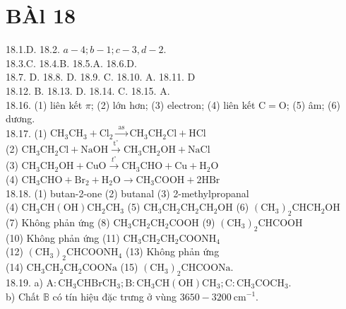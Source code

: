 \documentclass[10pt]{article}
\begin{document}
\section*{BÀl 18}
18.1.D. 18.2. $a-4 ; b-1 ; c-3, d-2$.\\
18.3.C. 18.4.B. 18.5.A. 18.6.D.\\
18.7. D. 18.8. D. 18.9. C. 18.10. A. 18.11. D\\
18.12. B. 18.13. D. 18.14. C. 18.15. A.\\
18.16. (1) liên kết $\pi$; (2) lớn hơn; (3) electron; (4) liên kết $\mathrm{C}=\mathrm{O}$; (5) âm; (6) dương.\\
18.17. (1) $\mathrm{CH}_{3} \mathrm{CH}_{3}+\mathrm{Cl}_{2} \xrightarrow{\text { as }} \mathrm{CH}_{3} \mathrm{CH}_{2} \mathrm{Cl}+\mathrm{HCl}$\\
(2) $\mathrm{CH}_{3} \mathrm{CH}_{2} \mathrm{Cl}+\mathrm{NaOH} \xrightarrow{\mathrm{t}^{\circ}} \mathrm{CH}_{3} \mathrm{CH}_{2} \mathrm{OH}+\mathrm{NaCl}$\\
(3) $\mathrm{CH}_{3} \mathrm{CH}_{2} \mathrm{OH}+\mathrm{CuO} \xrightarrow{t^{\circ}} \mathrm{CH}_{3} \mathrm{CHO}+\mathrm{Cu}+\mathrm{H}_{2} \mathrm{O}$\\
(4) $\mathrm{CH}_{3} \mathrm{CHO}+\mathrm{Br}_{2}+\mathrm{H}_{2} \mathrm{O} \longrightarrow \mathrm{CH}_{3} \mathrm{COOH}+2 \mathrm{HBr}$\\
18.18. (1) butan-2-one (2) butanal (3) 2-methylpropanal\\
(4) $\mathrm{CH}_{3} \mathrm{CH}(\mathrm{OH}) \mathrm{CH}_{2} \mathrm{CH}_{3}$ (5) $\mathrm{CH}_{3} \mathrm{CH}_{2} \mathrm{CH}_{2} \mathrm{CH}_{2} \mathrm{OH}$ (6) $\left(\mathrm{CH}_{3}\right)_{2} \mathrm{CHCH}_{2} \mathrm{OH}$\\
(7) Không phản ứng (8) $\mathrm{CH}_{3} \mathrm{CH}_{2} \mathrm{CH}_{2} \mathrm{COOH}$ (9) $\left(\mathrm{CH}_{3}\right)_{2} \mathrm{CHCOOH}$\\
(10) Không phản ứng (11) $\mathrm{CH}_{3} \mathrm{CH}_{2} \mathrm{CH}_{2} \mathrm{COONH}_{4}$\\
(12) $\left(\mathrm{CH}_{3}\right)_{2} \mathrm{CHCOONH}_{4}$ (13) Không phản ứng\\
(14) $\mathrm{CH}_{3} \mathrm{CH}_{2} \mathrm{CH}_{2} \mathrm{COONa}$ (15) $\left(\mathrm{CH}_{3}\right)_{2} \mathrm{CHCOONa}$.\\
18.19. a) $\mathrm{A}: \mathrm{CH}_{3} \mathrm{CHBrCH}_{3} ; \mathrm{B}: \mathrm{CH}_{3} \mathrm{CH}(\mathrm{OH}) \mathrm{CH}_{3} ; \mathrm{C}: \mathrm{CH}_{3} \mathrm{COCH}_{3}$.\\
b) Chất $\mathbb{B}$ có tín hiệu đặc trưng ở vùng $3650-3200 \mathrm{~cm}^{-1}$.
\end{document}
